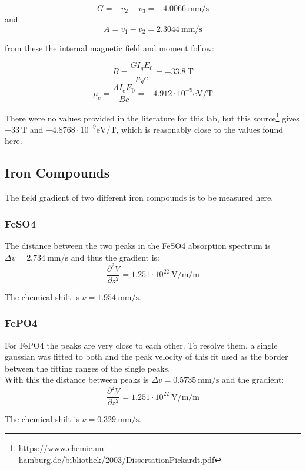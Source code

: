 $$G = -v_2 - v_3 = -4.0066 \ \text{mm}/\text{s}$$
and
$$A = v_1 - v_2= 2.3044 \ \text{mm}/\text{s}$$

from these the internal magnetic field and moment follow:

$$B = \frac{G I_g E_0}{\mu_g c} = -33.8 \ \text{T}$$
$$\mu_e = \frac{A I_e E_0}{B c} = -4.912 \cdot 10^{-9} \text{eV}/\text{T}$$

There were no values provided in the literature for this lab, but this source\footnote{https://www.chemie.uni-hamburg.de/bibliothek/2003/DissertationPickardt.pdf} gives $-33 \ \text{T}$ and $-4.8768 \cdot 10^{-9} \text{eV}/\text{T}$, which is reasonably close to the values found here.

\subsection{Iron Compounds}
The field gradient of two different iron compounds is to be measured here.
\subsubsection{FeSO4}
The distance between the two peaks in the FeSO4 absorption spectrum is $\Delta v = 2.734 \ \text{mm}/\text{s}$ and thus the gradient is:
$$\frac{\partial^2 V}{\partial z^2} = 1.251 \cdot 10^{22} \ \text{V}/\text{m}/\text{m}$$

The chemical shift is $\nu = 1.954 \ \text{mm}/\text{s}$.


\subsubsection{FePO4}
For FePO4 the peaks are very close to each other. To resolve them, a single gaussian was fitted to both and the peak velocity of this fit used as the border between the fitting ranges of the single peaks.\\
With this the distance between peaks is $\Delta v = 0.5735 \ \text{mm}/\text{s}$ and the gradient:
$$\frac{\partial^2 V}{\partial z^2} = 1.251 \cdot 10^{22} \ \text{V}/\text{m}/\text{m}$$

The chemical shift is $\nu = 0.329 \ \text{mm}/\text{s}$.

